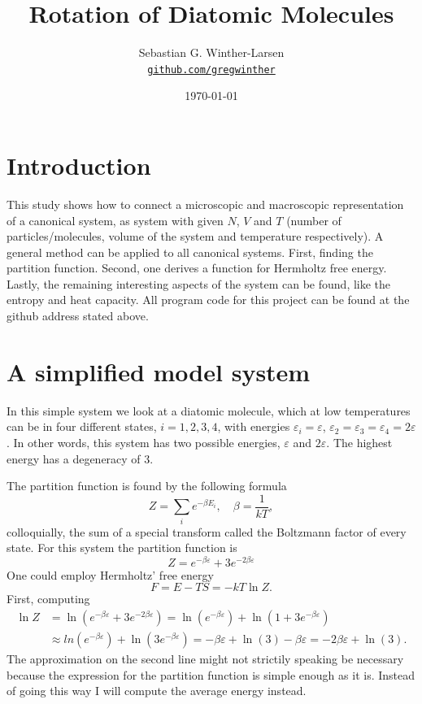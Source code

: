 \documentclass[10pt,a4paper]{amsart}
\title[Rotation of Diatomic Molecules]{Rotation of Diatomic Molecules \\
	\hrulefill\fbox{FYS2160}\hrulefill}
\author[Winther-Larsen]{Sebastian G. Winther-Larsen\\
\href{https://github.com/gregwinther/FYS2160/}{\texttt{github.com/gregwinther}}}
\date{\today}
\begin{document}
\maketitle

\section{Introduction}
This study shows how to connect a microscopic and macroscopic representation of a canonical system, as system with given $N$, $V$ and $T$ (number of particles/molecules, volume of the system and temperature respectively). A general method can be applied to all canonical systems. First, finding the partition function. Second, one derives a function for Hermholtz free energy. Lastly, the remaining interesting aspects of the system can be found, like the entropy and heat capacity. All program code for this project can be found at the github address stated above.

\section{A simplified model system}
In this simple system we look at a diatomic molecule, which at low temperatures can be in four different states, $i=1,2,3,4$, with energies $\varepsilon_i=\varepsilon$, $\varepsilon_2=\varepsilon_3=\varepsilon_4=2\varepsilon$. In other words, this system has two possible energies, $\varepsilon$ and $2\varepsilon$. The highest energy has a degeneracy of $3$.

The partition function is found by the following formula
\begin{equation}
Z = \sum_ie^{-\beta E_i},\quad \beta=\frac{1}{kT},
\end{equation}
colloquially, the sum of a special transform called the Boltzmann factor of every state. For this system the partition function is
\begin{equation}
Z = e^{-\beta\varepsilon}+3e^{-2\beta\varepsilon}
\end{equation}
One could employ Hermholtz' free energy
\begin{equation}
F = E - TS= -kT\ln Z.
\end{equation}
First, computing
\begin{align*}
\ln Z &= \ln (e^{-\beta\varepsilon}+3e^{-2\beta\varepsilon} ) = \ln( e^{-\beta\varepsilon}) + \ln(1+3e^{-\beta\varepsilon} ) \\
&\approx ln( e^{-\beta\varepsilon}) + \ln(3e^{-\beta\varepsilon} )  = -\beta\varepsilon + \ln(3) -\beta\varepsilon  = -2\beta\varepsilon + \ln(3).
\end{align*}
The approximation on the second line might not strictily speaking be necessary because the expression for the partition function is simple enough as it is. Instead of going this way I will compute the average energy instead.
\end{document}
